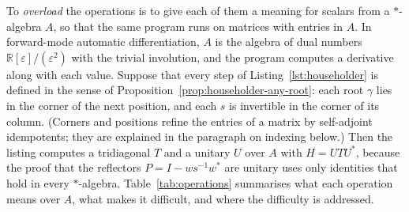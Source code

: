 \documentclass[12pt, a4paper]{report}
\theoremstyle{plain}
\theoremstyle{definition}
\theoremstyle{remark}
\theoremstyle{plain}
\newcommand{\staralg}[0]{$*$-algebra}
\newcommand{\RR}{\mathbb{R}}
\begin{document}
To \emph{overload} the operations is to give each of them a meaning for scalars from a \staralg{} $A$, so that the same program runs on matrices with entries in $A$. In forward-mode automatic differentiation, $A$ is the algebra of dual numbers $\RR[\varepsilon]/(\varepsilon^2)$ with the trivial involution, and the program computes a derivative along with each value. Suppose that every step of Listing~\ref{lst:householder} is defined in the sense of Proposition~\ref{prop:householder-any-root}: each root $\gamma$ lies in the corner of the next position, and each $s$ is invertible in the corner of its column. (Corners and positions refine the entries of a matrix by self-adjoint idempotents; they are explained in the paragraph on indexing below.) Then the listing computes a tridiagonal $T$ and a unitary $U$ over $A$ with $H=UTU^*$, because the proof that the reflectors $P=I-ws^{-1}w^*$ are unitary uses only identities that hold in every \staralg{}. Table~\ref{tab:operations} summarises what each operation means over $A$, what makes it difficult, and where the difficulty is addressed.
\end{document}
